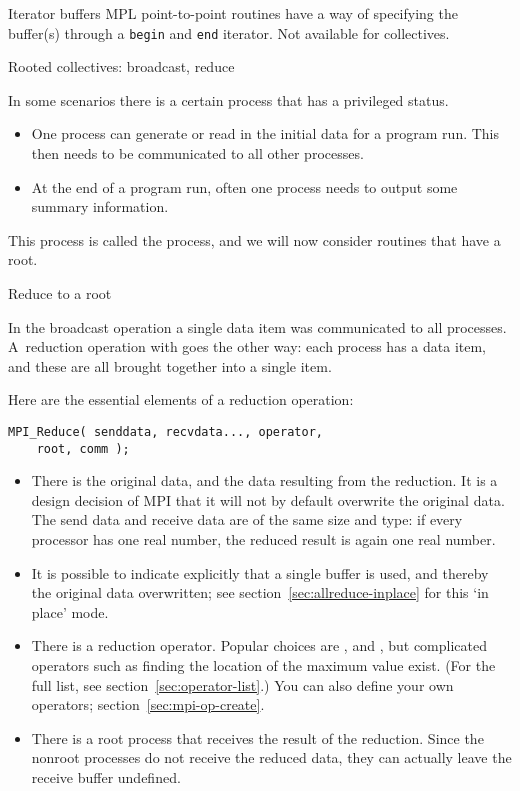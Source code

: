 \begin{mplnote}{Iterator buffers}
  \label{mpl:buf-itr}
  MPL point-to-point routines have a way of specifying the buffer(s)
  through a \lstinline{begin} and \lstinline{end} iterator.
  Not available for collectives.
\end{mplnote}

 {Rooted collectives: broadcast, reduce}
\label{sec:rooted}

In some scenarios there is a certain process that has a privileged status.
\begin{itemize}
\item
  One process can generate or read in the initial data for a program
  run. This then needs to be communicated to all other processes.
\item
  At the end of a program run, often
  one process needs to output some summary information.
\end{itemize}
This process is called the  process, and we will now
consider routines that have a root.

 {Reduce to a root}
\label{sec:reduce-root}

In the broadcast operation a single data item was communicated to all
processes. A~reduction operation with
%
%
goes the other way: each process has a
data item, and these are all brought together into a single item.

Here are the essential elements of a reduction operation:
\begin{lstlisting}
MPI_Reduce( senddata, recvdata..., operator,
    root, comm ); 
\end{lstlisting}
\begin{itemize}
\item There is the original data, and the data resulting from the
  reduction. It is a design decision of MPI that it will not by
  default overwrite the original data. The send data and receive data
  are of the same size and type: if every processor has one real
  number, the reduced result is again one real number.
\item It is possible to indicate explicitly that a single buffer
  is used, and thereby the original data overwritten;
  see section~\ref{sec:allreduce-inplace} for this `in place' mode.
\item There is a reduction operator. Popular choices are
  ,  and
  , but complicated operators such as finding
  the location of the maximum value exist.
  (For the full list, see section~\ref{sec:operator-list}.)
  You can also define your
  own operators; section~\ref{sec:mpi-op-create}.
\item There is a root process that receives the result of the
  reduction. Since the nonroot processes do not receive the reduced
  data, they can actually leave the receive buffer undefined.
\end{itemize}

